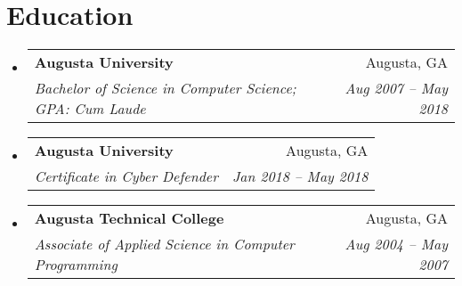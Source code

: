 \documentclass[letterpaper,11pt]{article}
\makeatletter
\newcommand{\resumeItem}[2]{
  \item\small{
    \textbf{#1}{: #2 \vspace{-2pt}}
  }
}
\newcommand{\resumeSubheading}[4]{
  \vspace{-1pt}\item
    \begin{tabular*}{0.97\textwidth}{l@{\extracolsep{\fill}}r}
      \textbf{#1} & #2 \\
      \textit{\small#3} & \textit{\small #4} \\
    \end{tabular*}\vspace{-5pt}
}
\newcommand{\resumeSubHeadingListStart}{\begin{itemize}[leftmargin=*]}
\newcommand{\resumeSubHeadingListEnd}{\end{itemize}}
\newcommand{\resumeItemListStart}{\begin{itemize}}
\newcommand{\resumeItemListEnd}{\end{itemize}\vspace{-5pt}}
\makeatother
\begin{document}
%
%
%

%



\section{Education}
  \resumeSubHeadingListStart
    \resumeSubheading
      {Augusta University}{Augusta, GA}
      {Bachelor of Science in Computer Science;  GPA: Cum Laude}{Aug 2007 -- May 2018}
    \resumeSubheading
      {Augusta University}{Augusta, GA}
      {Certificate in Cyber Defender}{Jan 2018 -- May 2018}
    \resumeSubheading
      {Augusta Technical College}{Augusta, GA}
      {Associate of Applied Science in Computer Programming}{Aug 2004 -- May 2007}
  \resumeSubHeadingListEnd
\end{document}
